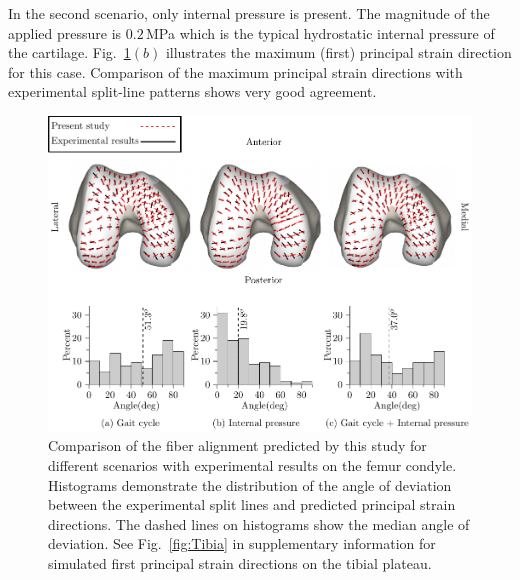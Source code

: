 In the second scenario, only internal pressure is present. The magnitude of the applied pressure is $0.2$\,MPa which is the typical hydrostatic internal pressure of the cartilage. Fig.~\ref{fig:Femur}$(b)$ illustrates the maximum (first) principal strain direction for this case. Comparison of the maximum principal strain directions with experimental split-line patterns shows very good agreement.

\begin{figure}[H]
	\begin{center}
		\includegraphics[width=\columnwidth]{images/AC/Femur-Revised.png}
		\caption{Comparison of the fiber alignment predicted by this study for different scenarios with experimental results \cite{Below2002} on the femur condyle. Histograms demonstrate the distribution of the angle of deviation between the experimental split lines and predicted principal strain directions. The dashed lines on histograms show the median angle of deviation. See Fig.~\ref{fig:Tibia} in supplementary information for simulated first principal strain directions on the tibial plateau.}\label{fig:Femur}
	\end{center}
\end{figure}


